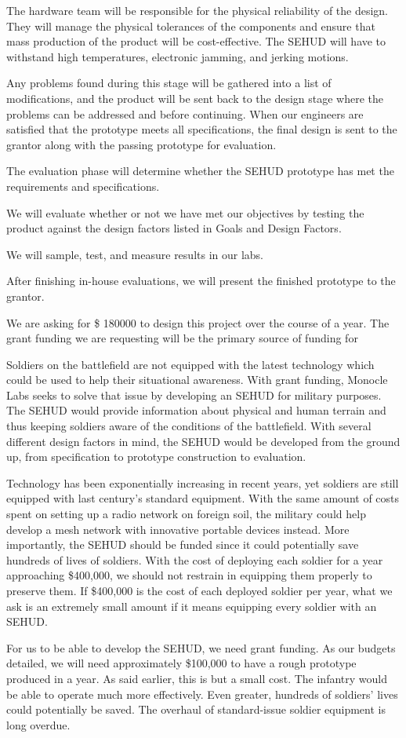 The hardware team will be responsible for the physical reliability of the
design. They will manage the physical tolerances of the components and ensure
that mass production of the product will be cost-effective. The SEHUD will
have to withstand high temperatures, electronic jamming, and jerking motions.

Any problems found during this stage will be gathered into a list of
modifications, and the product will be sent back to the design stage where
the problems can be addressed and before continuing. When our engineers are
satisfied that the prototype meets all specifications, the final design is
sent to the grantor along with the passing prototype for evaluation.

The evaluation phase will determine whether the SEHUD prototype has
met the requirements and specifications.

We will evaluate whether or not we have met our objectives by
testing the product against the design factors listed in Goals
and Design Factors.

We will sample, test, and measure results in our labs.

After finishing in-house evaluations, we will present the finished
prototype to the grantor.

We are asking for \$ 180000 to design this project over the course of a year.
The grant funding we are requesting will be the primary source of funding for

Soldiers on the battlefield are not equipped with the latest technology which
could be used to help their situational awareness. With grant funding, Monocle
Labs seeks to solve that issue by developing an SEHUD for military purposes.
The SEHUD would provide information about physical and human terrain and thus
keeping soldiers aware of the conditions of the battlefield. With several
different design factors in mind, the SEHUD would be developed from the ground
up, from specification to prototype construction to evaluation.

Technology has been exponentially increasing in recent years, yet soldiers are
still equipped with last century's standard equipment. With the same amount of
costs spent on setting up a radio network on foreign soil, the military could
help develop a mesh network with innovative portable devices instead. More
importantly, the SEHUD should be funded since it could potentially save
hundreds of lives of soldiers. With the cost of deploying each soldier for a
year approaching \$400,000, we should not restrain in equipping them properly
to preserve them. If \$400,000 is the cost of each deployed soldier per year,
what we ask is an extremely small amount if it means equipping every soldier
with an SEHUD.

For us to be able to develop the SEHUD, we need grant funding. As our budgets
detailed, we will need approximately \$100,000 to have a rough prototype
produced in a year. As said earlier, this is but a small cost. The infantry
would be able to operate much more effectively. Even greater, hundreds of
soldiers' lives could potentially be saved. The overhaul of standard-issue
soldier equipment is long overdue.
